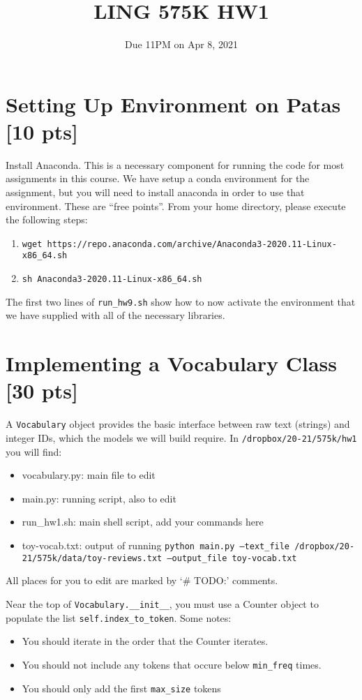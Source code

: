 \documentclass[11pt]{article}
\begin{document}
\title{LING 575K HW1}
\date{\vspace{-0.2in}Due 11PM on Apr 8, 2021}
\maketitle


\section{Setting Up Environment on Patas [10 pts]}

Install Anaconda. This is a necessary component for running the code for most assignments in this course.  We have setup a conda environment for the assignment, but you will need to install anaconda in order to use that environment.  These are ``free points''.  From your home directory, please execute the following steps:
\begin{enumerate}
	\item \texttt{wget https://repo.anaconda.com/archive/Anaconda3-2020.11-Linux-x86\_64.sh}
	\item \texttt{sh Anaconda3-2020.11-Linux-x86\_64.sh}
\end{enumerate}
The first two lines of \texttt{run\_hw9.sh} show how to now activate the environment that we have supplied with all of the necessary libraries.


\section{Implementing a Vocabulary Class [30 pts]}

A \texttt{Vocabulary} object provides the basic interface between raw text (strings) and integer IDs, which the models we will build require.  In \texttt{/dropbox/20-21/575k/hw1} you will find:
\begin{itemize}
  \item vocabulary.py: main file to edit
  \item main.py: running script, also to edit
  \item run\_hw1.sh: main shell script, add your commands here
  \item toy-vocab.txt: output of running \texttt{python main.py --text\_file /dropbox/20-21/575k/data/toy-reviews.txt --output\_file toy-vocab.txt}
\end{itemize}
All places for you to edit are marked by `\# TODO:' comments.

\vspace{2em}
 Near the top of \texttt{Vocabulary.\_\_init\_\_}, you must use a Counter object to populate the list \texttt{self.index\_to\_token}.  Some notes:
\begin{itemize}
  \item You should iterate in the order that the Counter iterates.
  \item You should not include any tokens that occure below \texttt{min\_freq} times.
  \item You should only add the first \texttt{max\_size} tokens
\end{itemize}
\end{document}
